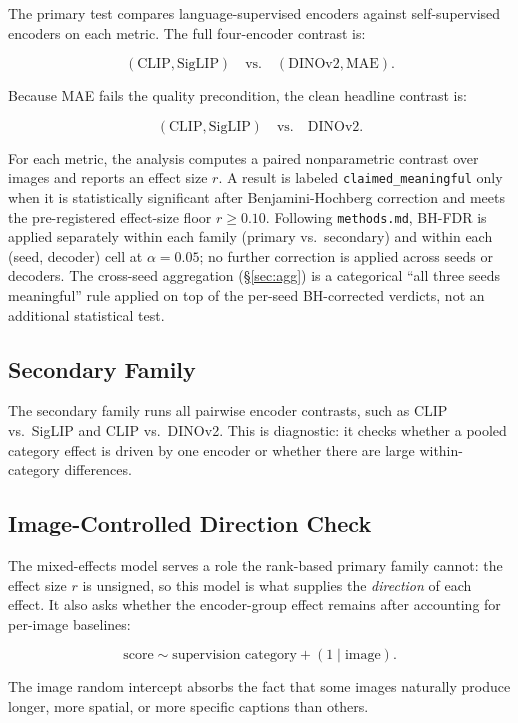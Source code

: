\documentclass[11pt]{article}
\newcommand{\code}[1]{\texttt{#1}}
\begin{document}
The primary test compares language-supervised encoders against
self-supervised encoders on each metric. The full four-encoder contrast is:

\[
(\text{CLIP}, \text{SigLIP}) \quad \text{vs.} \quad
(\text{DINOv2}, \text{MAE}).
\]

Because MAE fails the quality precondition, the clean headline contrast is:

\[
(\text{CLIP}, \text{SigLIP}) \quad \text{vs.} \quad \text{DINOv2}.
\]

For each metric, the analysis computes a paired nonparametric contrast over
images and reports an effect size \(r\). A result is labeled
\code{claimed\_meaningful} only when it is statistically significant after
Benjamini-Hochberg correction and meets the pre-registered effect-size floor
\(r \ge 0.10\). Following \code{methods.md}, BH-FDR is applied separately
within each family (primary vs.\ secondary) and within each
(seed, decoder) cell at \(\alpha=0.05\); no further correction is applied
across seeds or decoders. The cross-seed aggregation (\S\ref{sec:agg}) is a
categorical ``all three seeds meaningful'' rule applied on top of the
per-seed BH-corrected verdicts, not an additional statistical test.

\subsection{Secondary Family}

The secondary family runs all pairwise encoder contrasts, such as CLIP vs.\
SigLIP and CLIP vs.\ DINOv2. This is diagnostic: it checks whether a pooled
category effect is driven by one encoder or whether there are large
within-category differences.

\subsection{Image-Controlled Direction Check}
\label{sec:mixed-effects}

The mixed-effects model serves a role the rank-based primary family cannot: the
effect size \(r\) is unsigned, so this model is what supplies the
\emph{direction} of each effect. It also asks whether the encoder-group effect
remains after accounting for per-image baselines:

\[
\text{score} \sim \text{supervision category} + (1 \mid \text{image}).
\]

The image random intercept absorbs the fact that some images naturally produce
longer, more spatial, or more specific captions than others.
\end{document}
